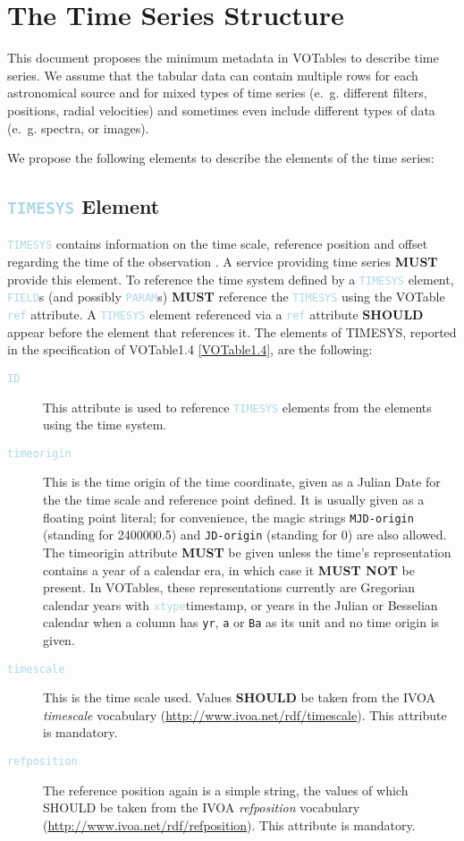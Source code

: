 \documentclass[11pt,a4paper]{ivoa}
\newcommand\elem[1]{\textcolor{LightBlue}{{\tt#1}}}
\begin{document}

\section{The Time Series Structure}
\label{elem:TIMESERIES}
This document proposes the minimum metadata in VOTables to describe time series. We assume that the tabular data can contain multiple rows for each astronomical source and for mixed types of time series (e.~g. different filters, positions, radial velocities) and sometimes even include different types of data (e.~g. spectra, or images). 

We propose the following elements to describe the elements of the time series: 

\subsection{\elem{TIMESYS} Element}
\elem{TIMESYS} contains information on the time scale, reference position and offset regarding the time of the observation \cite{VOTable1.4, TIMESYS}. A service providing time series \textbf{MUST} provide this element. To reference the time system defined by a \elem{TIMESYS} element, \elem{FIELD}s (and possibly \elem{PARAM}s) \textbf{MUST} reference the \elem{TIMESYS} using the VOTable \elem{ref} attribute. A \elem{TIMESYS} element referenced via a \elem{ref} attribute \textbf{SHOULD} appear before the element that references it.  The elements of TIMESYS, reported in the specification of VOTable1.4 \ref{VOTable1.4}, are the following:
\begin{description}
   \item[\elem{ID}] This attribute is used to reference \elem{TIMESYS} elements from the elements using the time system.
   \item[\elem{timeorigin}] This is the time origin of the time coordinate, given as a Julian Date for the the time scale and reference point
defined.  It is usually given as a floating point literal; for convenience, the magic strings \verb|MJD-origin| (standing
for 2400000.5) and \verb|JD-origin| (standing for 0) are also allowed. The timeorigin attribute \textbf{MUST} be given unless the time's representation contains a year of a calendar era, in which case it \textbf{MUST NOT} be present. In VOTables, these representations currently are Gregorian calendar years with \elem{xtype}{timestamp}, or years in the Julian or Besselian calendar when a column has \verb|yr|, \verb|a| or \verb|Ba| as its unit and no time origin is given. 
   \item[\elem{timescale}] This is the time scale used. Values \textbf{SHOULD} be taken from the IVOA \emph{timescale} vocabulary (\url{http://www.ivoa.net/rdf/timescale}). This attribute is mandatory.
   \item[\elem{refposition}] The reference position again is a simple string, the values of which SHOULD be taken from the IVOA \emph{refposition} vocabulary (\url{http://www.ivoa.net/rdf/refposition}). This attribute is mandatory.
\end{description}
\end{document}
